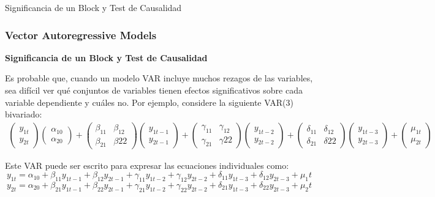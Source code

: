 \documentclass[spanish,xcolor=table]{beamer}
\begin{document}
\begin{section}{Significancia de un Block y Test de Causalidad}
\begin{frame}
\frametitle{Vector Autoregressive Models}

\textbf{Significancia de un Block y Test de Causalidad}

Es probable que, cuando un modelo VAR incluye muchos rezagos de las variables, sea dif\'{i}cil ver qu\'e conjuntos de variables tienen efectos significativos sobre cada variable dependiente y cu\'ales no. Por ejemplo, considere la siguiente VAR(3) bivariado:
\scriptsize
\begin{gather*}
\begin{pmatrix} y_{1t} \\ y_{2t} \end{pmatrix}
\begin{pmatrix} \alpha_{10} \\ \alpha_{20} \end{pmatrix}
+
\begin{pmatrix} \beta_{11} & \beta_{12} \\ \beta_{21} & \beta{22} \end{pmatrix}
\begin{pmatrix} y_{1t-1} \\ y_{2t-1} \end{pmatrix}
+
\begin{pmatrix} \gamma_{11} & \gamma_{12} \\ \gamma_{21} & \gamma{22} \end{pmatrix}
\begin{pmatrix} y_{1t-2} \\ y_{2t-2} \end{pmatrix}
+
\begin{pmatrix} \delta_{11} & \delta_{12} \\ \delta_{21} & \delta{22} \end{pmatrix}
\begin{pmatrix} y_{1t-3} \\ y_{2t-3} \end{pmatrix}
+
\begin{pmatrix} \mu_{1t} \\ \mu_{2t} \end{pmatrix}
\end{gather*}


Este VAR puede ser escrito para expresar las ecuaciones individuales como:
\footnotesize
\begin{equation*}
y_{1t} = \alpha_{10} + \beta_{11} y_{1t-1} + \beta_{12} y_{2t-1} + \gamma_{11} y_{1t-2} + \gamma_{12} y_{2t-2} + \delta_{11} y_{1t-3} + \delta_{12} y_{2t-3} + \mu_1t
\end{equation*}
\begin{equation*}
y_{2t} = \alpha_{20} + \beta_{21} y_{1t-1} + \beta_{22} y_{2t-1} + \gamma_{21} y_{1t-2} +\gamma_{22} y_{2t-2} + \delta_{21} y_{1t-3} + \delta_{22} y_{2t-3} + \mu_2t
\end{equation*}


\end{frame}
\end{section}
\end{document}
